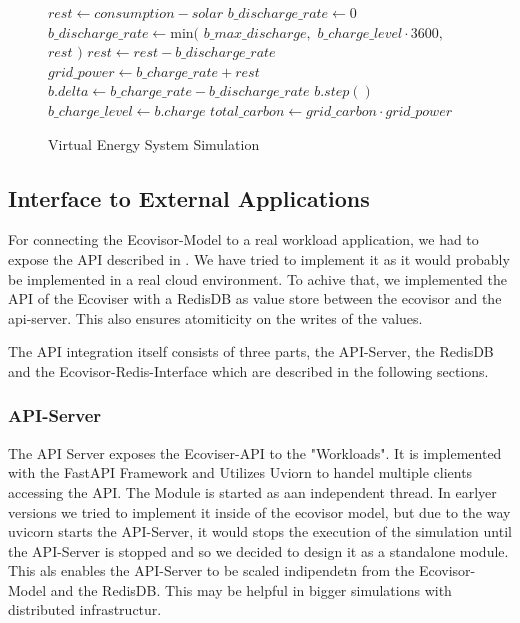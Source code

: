 \begin{figure}
    \removelatexerror
    \begin{algorithm}[H]
        \caption{Virtual Energy System Simulation}
        \label{alg:virtual_energy_system_simulation}
        $rest \gets consumption - solar$\;
         {
            $b\_discharge\_rate \gets 0$\;
        }{
            $b\_discharge\_rate \gets \text{min}($\;
            \Indp
                $b\_max\_discharge,$\;
                $b\_charge\_level \cdot 3600,$\;
                $rest$\;
            \Indm
            $)$\;
            $rest \gets rest - b\_discharge\_rate$\;
        }
        $grid\_power \gets b\_charge\_rate + rest$\;
        $b.delta \gets b\_charge\_rate - b\_discharge\_rate$\;
        $b.step()$\;
        $b\_charge\_level \gets b.charge$\;
        $total\_carbon \gets grid\_carbon \cdot grid\_power$\;
        \vspace{3mm}
    \end{algorithm}
\end{figure}

\subsection{Interface to External Applications}

For connecting the Ecovisor-Model to a real workload application, we had to expose the API described in \cite{souza2023}. We have tried to implement it as it would probably be implemented in a real cloud environment. %
To achive that, we implemented the API of the Ecoviser with a RedisDB as value store between the ecovisor and the api-server. This also ensures atomiticity on the writes of the values. %

The API integration itself consists of three parts, the API-Server, the RedisDB and the Ecovisor-Redis-Interface which are described in the following sections.



\subsubsection{API-Server}
The API Server exposes the Ecoviser-API to the "Workloads". It is implemented with the FastAPI Framework and Utilizes Uviorn to handel multiple clients accessing the API.
The Module is started as aan independent thread. In earlyer versions we tried to implement it inside of the ecovisor model, but due to the way uvicorn starts the API-Server,
it would stops the execution of the simulation until the API-Server is stopped and so we decided to design it as a standalone module. This als enables the API-Server to be scaled indipendetn from
the Ecovisor-Model and the RedisDB. This may be helpful in bigger simulations with distributed infrastructur.



